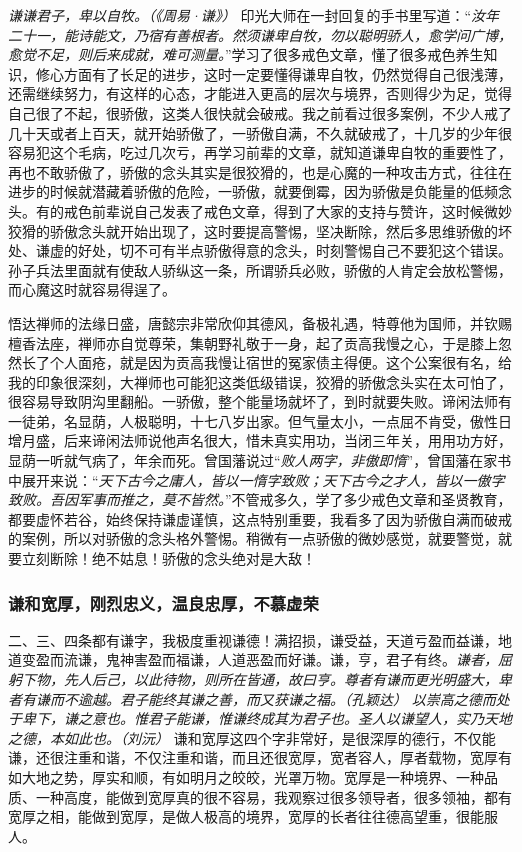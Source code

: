 \textit{谦谦君子，卑以自牧。（《周易·谦》）} 印光大师在一封回复的手书里写道：“\textit{汝年二十一，能诗能文，乃宿有善根者。然须谦卑自牧，勿以聪明骄人，愈学问广博，愈觉不足，则后来成就，难可测量。}”学习了很多戒色文章，懂了很多戒色养生知识，修心方面有了长足的进步，这时一定要懂得谦卑自牧，仍然觉得自己很浅薄，还需继续努力，有这样的心态，才能进入更高的层次与境界，否则得少为足，觉得自己很了不起，很骄傲，这类人很快就会破戒。我之前看过很多案例，不少人戒了几十天或者上百天，就开始骄傲了，一骄傲自满，不久就破戒了，十几岁的少年很容易犯这个毛病，吃过几次亏，再学习前辈的文章，就知道谦卑自牧的重要性了，再也不敢骄傲了，骄傲的念头其实是很狡猾的，也是心魔的一种攻击方式，往往在进步的时候就潜藏着骄傲的危险，一骄傲，就要倒霉，因为骄傲是负能量的低频念头。有的戒色前辈说自己发表了戒色文章，得到了大家的支持与赞许，这时候微妙狡猾的骄傲念头就开始出现了，这时要提高警惕，坚决断除，然后多思维骄傲的坏处、谦虚的好处，切不可有半点骄傲得意的念头，时刻警惕自己不要犯这个错误。孙子兵法里面就有使敌人骄纵这一条，所谓骄兵必败，骄傲的人肯定会放松警惕，而心魔这时就容易得逞了。

悟达禅师的法缘日盛，唐懿宗非常欣仰其德风，备极礼遇，特尊他为国师，并钦赐檀香法座，禅师亦自觉尊荣，集朝野礼敬于一身，起了贡高我慢之心，于是膝上忽然长了个人面疮，就是因为贡高我慢让宿世的冤家债主得便。这个公案很有名，给我的印象很深刻，大禅师也可能犯这类低级错误，狡猾的骄傲念头实在太可怕了，很容易导致阴沟里翻船。一骄傲，整个能量场就坏了，到时就要失败。谛闲法师有一徒弟，名显荫，人极聪明，十七八岁出家。但气量太小，一点屈不肯受，傲性日增月盛，后来谛闲法师说他声名很大，惜未真实用功，当闭三年关，用用功方好，显荫一听就气病了，年余而死。曾国藩说过“\textit{败人两字，非傲即惰}”，曾国藩在家书中展开来说：“\textit{天下古今之庸人，皆以一惰字致败；天下古今之才人，皆以一傲字致败。吾因军事而推之，莫不皆然。}”不管戒多久，学了多少戒色文章和圣贤教育，都要虚怀若谷，始终保持谦虚谨慎，这点特别重要，我看多了因为骄傲自满而破戒的案例，所以对骄傲的念头格外警惕。稍微有一点骄傲的微妙感觉，就要警觉，就要立刻断除！绝不姑息！骄傲的念头绝对是大敌！

\subsubsection{谦和宽厚，刚烈忠义，温良忠厚，不慕虚荣}

二、三、四条都有谦字，我极度重视谦德！满招损，谦受益，天道亏盈而益谦，地道变盈而流谦，鬼神害盈而福谦，人道恶盈而好谦。谦，亨，君子有终。\textit{谦者，屈躬下物，先人后己，以此待物，则所在皆通，故曰亨。尊者有谦而更光明盛大，卑者有谦而不逾越。君子能终其谦之善，而又获谦之福。（孔颖达）} \textit{以崇高之德而处于卑下，谦之意也。惟君子能谦，惟谦终成其为君子也。圣人以谦望人，实乃天地之德，本如此也。（刘沅）} 谦和宽厚这四个字非常好，是很深厚的德行，不仅能谦，还很注重和谐，不仅注重和谐，而且还很宽厚，宽者容人，厚者载物，宽厚有如大地之势，厚实和顺，有如明月之皎皎，光罩万物。宽厚是一种境界、一种品质、一种高度，能做到宽厚真的很不容易，我观察过很多领导者，很多领袖，都有宽厚之相，能做到宽厚，是做人极高的境界，宽厚的长者往往德高望重，很能服人。

